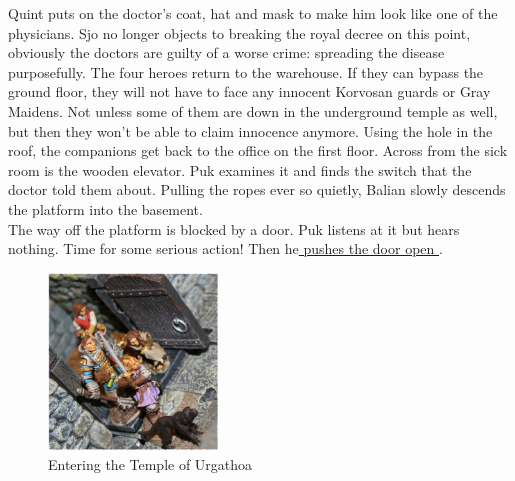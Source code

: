 Quint puts on the doctor's coat, hat and mask to make him look like one of the physicians. Sjo no longer objects to breaking the royal decree on this point, obviously the doctors are guilty of a worse crime: spreading the disease purposefully. The four heroes return to the warehouse. If they can bypass the ground floor, they will not have to face any innocent Korvosan guards or Gray Maidens. Not unless some of them are down in the underground temple as well, but then they won't be able to claim innocence anymore. Using the hole in the roof, the companions get back to the office on the first floor. Across from the sick room is the wooden elevator. Puk examines it and finds the switch that the doctor told them about. Pulling the ropes ever so quietly, Balian slowly descends the platform into the basement.\\

The way off the platform is blocked by a door. Puk listens at it but hears nothing. Time for some serious action! Then he\hyperref[fig:Entering-the-Temple-of-Urgathoa-516987053]{ pushes the door open } . \\

\begin{figure}[h]
	\centering
	\includegraphics[width=0.4\textwidth]{images/Entering-the-Temple-of-Urgathoa-516987053_mod.jpg}
	\caption{Entering the Temple of Urgathoa}
	\label{fig:Entering-the-Temple-of-Urgathoa-516987053}
\end{figure}


